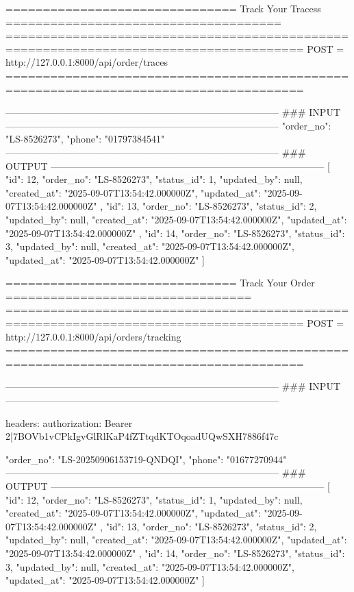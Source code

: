 =============================== Track Your Tracess =====================================
======================================================================================
POST	= http://127.0.0.1:8000/api/order/traces
======================================================================================

--------------------------------------------------------------------------------------
### INPUT
--------------------------------------------------------------------------------------
{
  "order_no": "LS-8526273",
  "phone": "01797384541"
}
--------------------------------------------------------------------------------------
### OUTPUT
--------------------------------------------------------------------------------------
[
  {
    "id": 12,
    "order_no": "LS-8526273",
    "status_id": 1,
    "updated_by": null,
    "created_at": "2025-09-07T13:54:42.000000Z",
    "updated_at": "2025-09-07T13:54:42.000000Z"
  },
  {
    "id": 13,
    "order_no": "LS-8526273",
    "status_id": 2,
    "updated_by": null,
    "created_at": "2025-09-07T13:54:42.000000Z",
    "updated_at": "2025-09-07T13:54:42.000000Z"
  },
  {
    "id": 14,
    "order_no": "LS-8526273",
    "status_id": 3,
    "updated_by": null,
    "created_at": "2025-09-07T13:54:42.000000Z",
    "updated_at": "2025-09-07T13:54:42.000000Z"
  }
]






=============================== Track Your Order     =================================
======================================================================================
POST	= http://127.0.0.1:8000/api/orders/tracking
======================================================================================

--------------------------------------------------------------------------------------
### INPUT
--------------------------------------------------------------------------------------

{
    headers: {
        authorization: Bearer 2|7BOVb1vCPkIgvGlRlKaP4fZTtqdKTOqoadUQwSXH7886f47c
    }
}

{
    "order_no": "LS-20250906153719-QNDQI",
    "phone": "01677270944"
}
--------------------------------------------------------------------------------------
### OUTPUT
--------------------------------------------------------------------------------------
[
  {
    "id": 12,
    "order_no": "LS-8526273",
    "status_id": 1,
    "updated_by": null,
    "created_at": "2025-09-07T13:54:42.000000Z",
    "updated_at": "2025-09-07T13:54:42.000000Z"
  },
  {
    "id": 13,
    "order_no": "LS-8526273",
    "status_id": 2,
    "updated_by": null,
    "created_at": "2025-09-07T13:54:42.000000Z",
    "updated_at": "2025-09-07T13:54:42.000000Z"
  },
  {
    "id": 14,
    "order_no": "LS-8526273",
    "status_id": 3,
    "updated_by": null,
    "created_at": "2025-09-07T13:54:42.000000Z",
    "updated_at": "2025-09-07T13:54:42.000000Z"
  }
]
